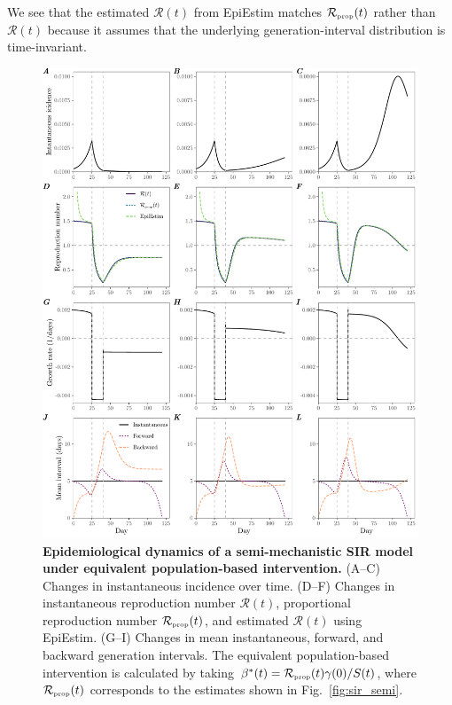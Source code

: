 \documentclass[12pt]{article}
\newcommand{\fref}[1]{Fig.~\ref{fig:#1}}
\newcommand{\RR}{\ensuremath{{\mathcal R}}\xspace}
\newcommand{\tsub}[2]{#1_{{\textrm{\tiny #2}}}}
\begin{document}
We see that the estimated $\RR(t)$ from EpiEstim matches $\tsub{\RR}{prop}(t)$ rather than $\RR(t)$ because it assumes that the underlying generation-interval distribution is time-invariant.

\begin{figure}
\includegraphics[width=\textwidth]{figure_sir_beta.pdf}
\caption{
\textbf{Epidemiological dynamics of a semi-mechanistic SIR model under equivalent population-based intervention.}
(A--C) Changes in instantaneous incidence over time.
(D--F) Changes in instantaneous reproduction number $\RR(t)$, proportional reproduction number $\tsub{\RR}{prop}(t)$, and estimated $\RR(t)$ using EpiEstim.
(G--I) Changes in mean instantaneous, forward, and backward generation intervals.
The equivalent population-based intervention is calculated by taking $\beta^\ast(t) = \tsub{\RR}{prop}(t)\gamma(0)/S(t)$, where $\tsub{\RR}{prop}(t)$ corresponds to the estimates shown in \fref{sir_semi}.
}
\label{fig:sir_beta}
\end{figure}
\end{document}
